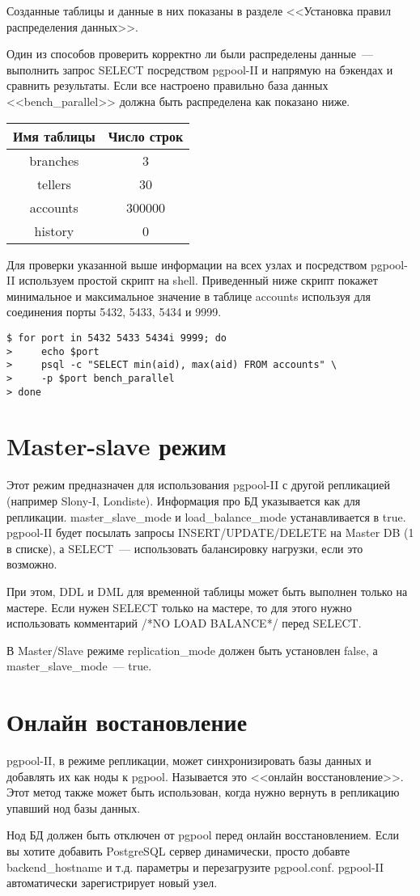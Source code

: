 Созданные таблицы и данные в них показаны в разделе <<Установка правил распределения данных>>.

Один из способов проверить корректно ли были распределены данные~--- выполнить запрос SELECT посредством 
pgpool-II и напрямую на бэкендах и сравнить результаты. Если все настроено правильно база данных 
<<bench\_parallel>> должна быть распределена как показано ниже.

\begin{tabular}{ | c | c | }
  \hline
  Имя таблицы & Число строк \\
  \hline
  branches & 3 \\
  \hline
  tellers & 30 \\
  \hline
  accounts & 300000 \\
  \hline
  history & 0 \\
  \hline
\end{tabular}

Для проверки указанной выше информации на всех узлах и посредством pgpool-II используем простой скрипт на shell. 
Приведенный ниже скрипт покажет минимальное и максимальное значение в таблице accounts используя для соединения 
порты 5432, 5433, 5434 и 9999.
\begin{verbatim}
$ for port in 5432 5433 5434i 9999; do
>     echo $port
>     psql -c "SELECT min(aid), max(aid) FROM accounts" \
>     -p $port bench_parallel
> done
\end{verbatim}


\section{Master-slave режим}
Этот режим предназначен для использования pgpool-II с другой репликацией (например Slony-I, Londiste). 
Информация про БД указывается как для репликации. master\_slave\_mode и load\_balance\_mode устанавливается в true. 
pgpool-II будет посылать запросы INSERT/UPDATE/DELETE на Master DB (1 в списке), а SELECT~--- использовать балансировку 
нагрузки, если это возможно.

При этом, DDL и DML для временной таблицы может быть выполнен только на мастере. Если нужен SELECT только на мастере, то для этого 
нужно использовать комментарий /*NO LOAD BALANCE*/ перед SELECT.

В Master/Slave режиме replication\_mode должен быть установлен false, а master\_slave\_mode~--- true.

\section{Онлайн востановление}
pgpool-II, в режиме репликации, может синхронизировать базы данных и добавлять их как ноды к pgpool. 
Называется это <<онлайн восстановление>>. Этот метод также может быть использован, когда нужно вернуть 
в репликацию упавший нод базы данных.

Нод БД должен быть отключен от pgpool перед онлайн восстановлением. 
Если вы хотите добавить PostgreSQL сервер динамически, просто добавте backend\_hostname и т.д. параметры и перезагрузите pgpool.conf. 
pgpool-II автоматически зарегистрирует новый узел.




